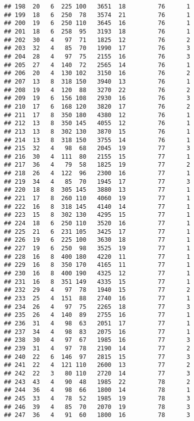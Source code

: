\documentclass[]{article}
\begin{document}
\begin{verbatim}
## 198  20   6  225 100   3651  18         76      1
## 199  18   6  250  78   3574  21         76      1
## 200  19   6  250 110   3645  16         76      1
## 201  18   6  258  95   3193  18         76      1
## 202  30   4   97  71   1825  12         76      2
## 203  32   4   85  70   1990  17         76      3
## 204  28   4   97  75   2155  16         76      3
## 205  27   4  140  72   2565  14         76      1
## 206  20   4  130 102   3150  16         76      2
## 207  13   8  318 150   3940  13         76      1
## 208  19   4  120  88   3270  22         76      2
## 209  19   6  156 108   2930  16         76      3
## 210  17   6  168 120   3820  17         76      2
## 211  17   8  350 180   4380  12         76      1
## 212  13   8  350 145   4055  12         76      1
## 213  13   8  302 130   3870  15         76      1
## 214  13   8  318 150   3755  14         76      1
## 215  32   4   98  68   2045  19         77      3
## 216  30   4  111  80   2155  15         77      1
## 217  36   4   79  58   1825  19         77      2
## 218  26   4  122  96   2300  16         77      1
## 219  34   4   85  70   1945  17         77      3
## 220  18   8  305 145   3880  13         77      1
## 221  17   8  260 110   4060  19         77      1
## 222  16   8  318 145   4140  14         77      1
## 223  15   8  302 130   4295  15         77      1
## 224  18   6  250 110   3520  16         77      1
## 225  21   6  231 105   3425  17         77      1
## 226  19   6  225 100   3630  18         77      1
## 227  19   6  250  98   3525  19         77      1
## 228  16   8  400 180   4220  11         77      1
## 229  16   8  350 170   4165  11         77      1
## 230  16   8  400 190   4325  12         77      1
## 231  16   8  351 149   4335  15         77      1
## 232  29   4   97  78   1940  15         77      2
## 233  25   4  151  88   2740  16         77      1
## 234  26   4   97  75   2265  18         77      3
## 235  26   4  140  89   2755  16         77      1
## 236  31   4   98  63   2051  17         77      1
## 237  34   4   98  83   2075  16         77      1
## 238  30   4   97  67   1985  16         77      3
## 239  31   4   97  78   2190  14         77      2
## 240  22   6  146  97   2815  15         77      3
## 241  22   4  121 110   2600  13         77      2
## 242  22   3   80 110   2720  14         77      3
## 243  43   4   90  48   1985  22         78      2
## 244  36   4   98  66   1800  14         78      1
## 245  33   4   78  52   1985  19         78      3
## 246  39   4   85  70   2070  19         78      3
## 247  36   4   91  60   1800  16         78      3

\end{verbatim}
\end{document}
